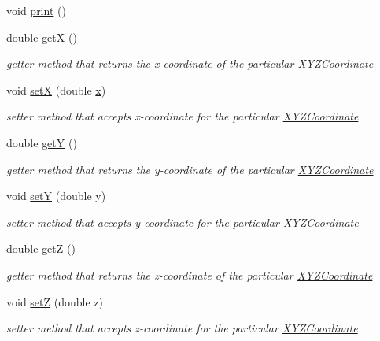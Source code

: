 \begin{DoxyCompactItemize}
void \hyperlink{classcoordinates_1_1_x_y_z_coordinate_a4ff7f1c0dee75f3c60dc735c26129761}{print} ()
\item 
double \hyperlink{classcoordinates_1_1_x_y_z_coordinate_ab9055f02276f40c7c9bd0929544b31d4}{getX} ()
\begin{DoxyCompactList}\small\item\em getter method that returns the x-\/coordinate of the particular \hyperlink{classcoordinates_1_1_x_y_z_coordinate}{X\+Y\+Z\+Coordinate} \end{DoxyCompactList}\item 
void \hyperlink{classcoordinates_1_1_x_y_z_coordinate_a38d36c730bd53179a0188d6d069f6400}{setX} (double \hyperlink{classcoordinates_1_1_x_y_z_coordinate_a93f191f410b19d99a71d3c66ef27df29}{x})
\begin{DoxyCompactList}\small\item\em setter method that accepts x-\/coordinate for the particular \hyperlink{classcoordinates_1_1_x_y_z_coordinate}{X\+Y\+Z\+Coordinate} \end{DoxyCompactList}\item 
double \hyperlink{classcoordinates_1_1_x_y_z_coordinate_a5b1614c8fb0680235ff866695d56bfd0}{getY} ()
\begin{DoxyCompactList}\small\item\em getter method that returns the y-\/coordinate of the particular \hyperlink{classcoordinates_1_1_x_y_z_coordinate}{X\+Y\+Z\+Coordinate} \end{DoxyCompactList}\item 
void \hyperlink{classcoordinates_1_1_x_y_z_coordinate_ae2af422b072d32e47eeef02520c74402}{setY} (double y)
\begin{DoxyCompactList}\small\item\em setter method that accepts y-\/coordinate for the particular \hyperlink{classcoordinates_1_1_x_y_z_coordinate}{X\+Y\+Z\+Coordinate} \end{DoxyCompactList}\item 
double \hyperlink{classcoordinates_1_1_x_y_z_coordinate_a1273b99ae80abff51a75b6ced7f3e10f}{getZ} ()
\begin{DoxyCompactList}\small\item\em getter method that returns the z-\/coordinate of the particular \hyperlink{classcoordinates_1_1_x_y_z_coordinate}{X\+Y\+Z\+Coordinate} \end{DoxyCompactList}\item 
void \hyperlink{classcoordinates_1_1_x_y_z_coordinate_a0e32806c394f28e22238765c2fde9eee}{setZ} (double z)
\begin{DoxyCompactList}\small\item\em setter method that accepts z-\/coordinate for the particular \hyperlink{classcoordinates_1_1_x_y_z_coordinate}{X\+Y\+Z\+Coordinate} \end{DoxyCompactList}\end{DoxyCompactItemize}
